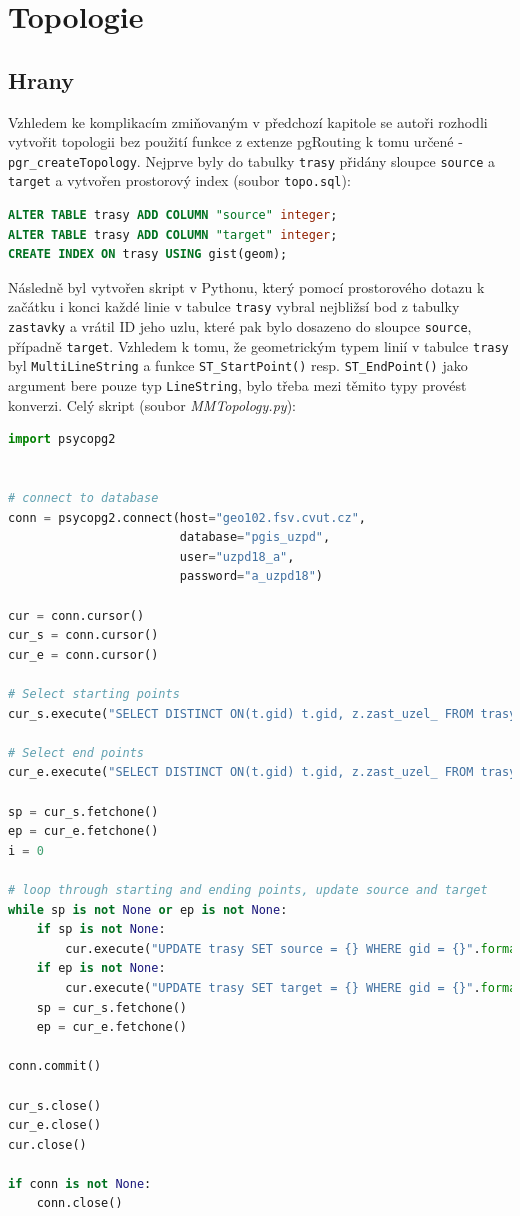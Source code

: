 \documentclass[a4paper, 12pt]{article}
\begin{document}
\section{Topologie}
\subsection{Hrany}
Vzhledem ke komplikacím zmiňovaným v předchozí kapitole se autoři rozhodli vytvořit topologii bez použití funkce z extenze pgRouting k tomu určené -  \texttt{pgr\_createTopology}. Nejprve byly do tabulky \texttt{trasy} přidány sloupce \texttt{source} a \texttt{target} a vytvořen prostorový index (soubor \texttt{topo.sql}): 
\begin{lstlisting}[language=sql]
ALTER TABLE trasy ADD COLUMN "source" integer;
ALTER TABLE trasy ADD COLUMN "target" integer;
CREATE INDEX ON trasy USING gist(geom);
\end{lstlisting} 

Následně byl vytvořen skript v Pythonu, který pomocí prostorového dotazu k začátku i konci každé linie v tabulce \texttt{trasy} vybral nejbližsí bod z tabulky \texttt{zastavky} a vrátil ID jeho uzlu, které pak bylo dosazeno do sloupce \texttt{source}, případně \texttt{target}. Vzhledem k tomu, že geometrickým typem linií v tabulce \texttt{trasy} byl \texttt{MultiLineString} a funkce \texttt{ST\_StartPoint()} resp. \texttt{ST\_EndPoint()} jako argument bere pouze typ \texttt{LineString}, bylo třeba mezi těmito typy provést konverzi.
\newpage
Celý skript (soubor \textit{MMTopology.py}):
\begin{lstlisting}[language=python]
import psycopg2


# connect to database
conn = psycopg2.connect(host="geo102.fsv.cvut.cz",
						database="pgis_uzpd",
						user="uzpd18_a",
						password="a_uzpd18")

cur = conn.cursor()
cur_s = conn.cursor()
cur_e = conn.cursor()

# Select starting points
cur_s.execute("SELECT DISTINCT ON(t.gid) t.gid, z.zast_uzel_ FROM trasy t, zastavky z WHERE ST_DWithin(ST_StartPoint(ST_LineMerge(t.geom)), z.geom, 500) AND t.zast_id_od = z.zast_id")

# Select end points
cur_e.execute("SELECT DISTINCT ON(t.gid) t.gid, z.zast_uzel_ FROM trasy t, zastavky z WHERE ST_DWithin(ST_EndPoint(ST_LineMerge(t.geom)), z.geom, 500) AND t.zast_id_ka = z.zast_id")

sp = cur_s.fetchone()
ep = cur_e.fetchone()
i = 0

# loop through starting and ending points, update source and target
while sp is not None or ep is not None:
	if sp is not None:
		cur.execute("UPDATE trasy SET source = {} WHERE gid = {}".format(sp[1],sp[0]))
	if ep is not None:
		cur.execute("UPDATE trasy SET target = {} WHERE gid = {}".format(ep[1],ep[0]))
	sp = cur_s.fetchone()
	ep = cur_e.fetchone()		

conn.commit()

cur_s.close()
cur_e.close()
cur.close()

if conn is not None:
	conn.close()
\end{lstlisting}
\end{document}
